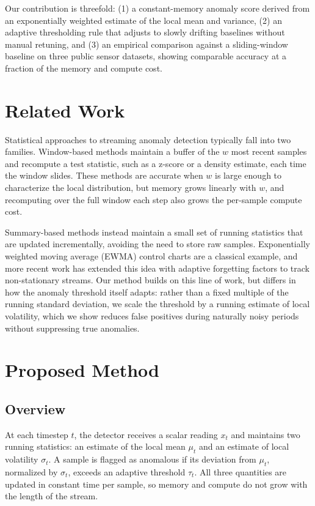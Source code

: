 \documentclass[journal]{IEEEtran}
\begin{document}
Our contribution is threefold: (1) a constant-memory anomaly score derived from an exponentially weighted estimate of the local mean and variance, (2) an adaptive thresholding rule that adjusts to slowly drifting baselines without manual retuning, and (3) an empirical comparison against a sliding-window baseline on three public sensor datasets, showing comparable accuracy at a fraction of the memory and compute cost.

\section{Related Work}
Statistical approaches to streaming anomaly detection typically fall into two families. Window-based methods maintain a buffer of the $w$ most recent samples and recompute a test statistic, such as a z-score or a density estimate, each time the window slides. These methods are accurate when $w$ is large enough to characterize the local distribution, but memory grows linearly with $w$, and recomputing over the full window each step also grows the per-sample compute cost.

Summary-based methods instead maintain a small set of running statistics that are updated incrementally, avoiding the need to store raw samples. Exponentially weighted moving average (EWMA) control charts are a classical example, and more recent work has extended this idea with adaptive forgetting factors to track non-stationary streams. Our method builds on this line of work, but differs in how the anomaly threshold itself adapts: rather than a fixed multiple of the running standard deviation, we scale the threshold by a running estimate of local volatility, which we show reduces false positives during naturally noisy periods without suppressing true anomalies.

\section{Proposed Method}
\subsection{Overview}
At each timestep $t$, the detector receives a scalar reading $x_t$ and maintains two running statistics: an estimate of the local mean $\mu_t$ and an estimate of local volatility $\sigma_t$. A sample is flagged as anomalous if its deviation from $\mu_t$, normalized by $\sigma_t$, exceeds an adaptive threshold $\tau_t$. All three quantities are updated in constant time per sample, so memory and compute do not grow with the length of the stream.
\end{document}
